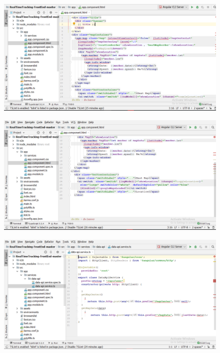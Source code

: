 \begin{enumerate}
	\\
	\begin{figure}[!h]
		\centerline{\includegraphics[width=1.1\textwidth]{code16}}
	\end{figure}
	\begin{figure}[!h]
		\centerline{\includegraphics[width=1.1\textwidth]{code17}}
	\end{figure}
\newpage
	\begin{figure}[!h]
		\centerline{\includegraphics[width=1.1\textwidth]{code18}}
	\end{figure}
	\begin{figure}[!h]

\end{figure}
\end{enumerate}
